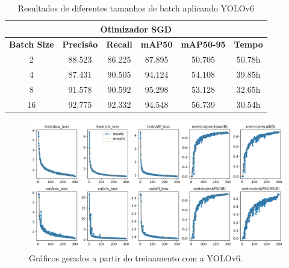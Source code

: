 \begin{table}[!hbt]
    \centering
    \begin{tabular}{|c|c|c|c|c|c|}
    \hline
    \multicolumn{6}{|c|}{\textbf{Otimizador SGD}} \\ \hline
    \textbf{Batch Size} & \textbf{Precisão} & \textbf{Recall} & \textbf{mAP50} & \textbf{mAP50-95} & \textbf{Tempo} \\ \hline
    2                   & 88.523                & 86.225               & 87.895              & 50.705                 & 50.78h             \\ \hline
    4                   & 87.431                 & 90.505               & 94.124             & 54.108                & 39.85h             \\ \hline
    8                   & 91.578                 & 90.592               & 95.298              & 53.128                 & 32.65h             \\ \hline
    16                  & 92.775                & 92.332               & 94.548             & 56.739                 & 30.54h             \\ \hline
    \end{tabular}
    \caption{Resultados de diferentes tamanhos de batch aplicando YOLOv6}
    \label{tab:yolov6-teste}
\end{table}


\begin{figure}[!h]
    \centering
    \begin{minipage}{1\linewidth}
    \centering
    \captionsetup{justification=centering,margin=0.5cm,font=small}
    \includegraphics[width=1\linewidth]{img/cap6/results-yolov6-batch-16.png}
    \caption{Gráficos gerados a partir do treinamento com a YOLOv6.}
    \label{fig:yolov6batch16}
    \end{minipage}
\end{figure}


